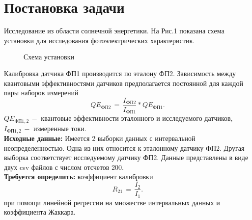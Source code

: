 \newpage
\section{Постановка задачи}

\begin{flushleft}
	Исследование из области солнечной энергетики. На Рис.1 показана схема установки для исследования фотоэлектрических характеристик.
\end{flushleft}
\begin{figure}[H]
	\caption{Схема установки}
	\label{fig:shcema}
\end{figure}
\begin{flushleft}
	Калибровка датчика ФП1 производится по эталону ФП2. Зависимость между квантовыми эффективностями датчиков предполагается постоянной для каждой пары наборов измерений
	\begin{equation}
		QE_{ФП2}\,=\,\frac{I_{ФП2}}{I_{ФП1}}*QE_{ФП1}.
		\label{1}
	\end{equation}
	$QE_{ФП1,2}\,-$ квантовые эффективности эталонного и исследуемого датчиков, $I_{ФП1,2}\,-$ измеренные токи.\\
	\textbf{Исходные данные:} Имеется 2 выборки данных с интервальной неопределенностью. Одна из них относится к эталонному датчику ФП2. Другая выборка соответствует исследуемому датчику ФП2. Данные представлены в виде двух csv файлов с числом отсчетов 200.\\
	\vspace{0.5em}
	\textbf{Требуется определить:} коэффициент калибровки
	\begin{equation}
		R_{21}\,=\,\frac{I_{2}}{I_{1}}.
		\label{2}
	\end{equation}
	при помощи линейной регрессии на множестве интервальных данных и коэффициента Жаккара.
\end{flushleft}